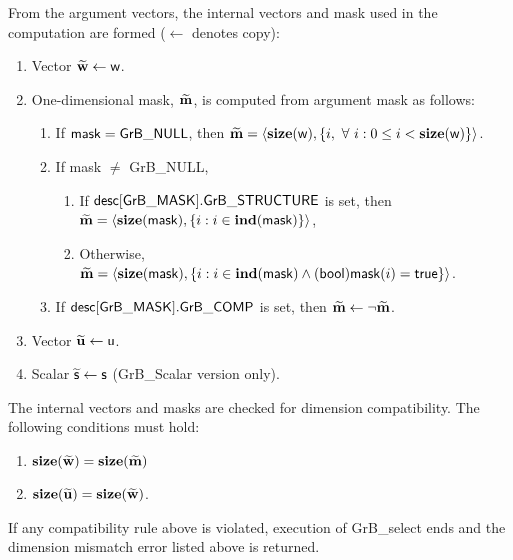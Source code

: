From the argument vectors, the internal vectors and mask used in 
the computation are formed ($\leftarrow$ denotes copy):
\begin{enumerate}
    \item Vector ${\bf \widetilde{w}} \leftarrow {\sf w}$.

    \item One-dimensional mask, ${\bf \widetilde{m}}$, is computed from 
    argument {\sf mask} as follows:
    \begin{enumerate}
        \item If ${\sf mask} = {\sf GrB\_NULL}$, then ${\bf \widetilde{m}} = 
        \langle \bold{size}({\sf w}), \{i, \ \forall \ i : 0 \leq i < 
        \bold{size}({\sf w}) \} \rangle$.

        \item If {\sf mask} $\ne$ {\sf GrB\_NULL},  
        \begin{enumerate}
            \item If ${\sf desc[GrB\_MASK].GrB\_STRUCTURE}$ is set, then
            ${\bf \widetilde{m}} = 
            \langle \bold{size}({\sf mask}), \{i : i \in \bold{ind}({\sf mask}) \} \rangle$,
            \item Otherwise, ${\bf \widetilde{m}} = 
            \langle \bold{size}({\sf mask}), \{i : i \in \bold{ind}({\sf mask}) \wedge
            ({\sf bool}){\sf mask}(i) = {\sf true} \} \rangle$.
        \end{enumerate}

        \item    If ${\sf desc[GrB\_MASK].GrB\_COMP}$ is set, then 
        ${\bf \widetilde{m}} \leftarrow \neg {\bf \widetilde{m}}$.
    \end{enumerate}

    \item Vector ${\bf \widetilde{u}} \leftarrow {\sf u}$.

    \item Scalar $\widetilde{\sf s} \leftarrow {\sf s}$ ({\sf GrB\_Scalar} version only).
\end{enumerate}

The internal vectors and masks are checked for dimension compatibility. 
The following conditions must hold:
\begin{enumerate}
    \item $\bold{size}({\bf \widetilde{w}}) = \bold{size}({\bf \widetilde{m}})$
    \item $\bold{size}({\bf \widetilde{u}}) = \bold{size}({\bf \widetilde{w}})$.
\end{enumerate}
If any compatibility rule above is violated, execution of {\sf GrB\_select} ends and 
the dimension mismatch error listed above is returned.

